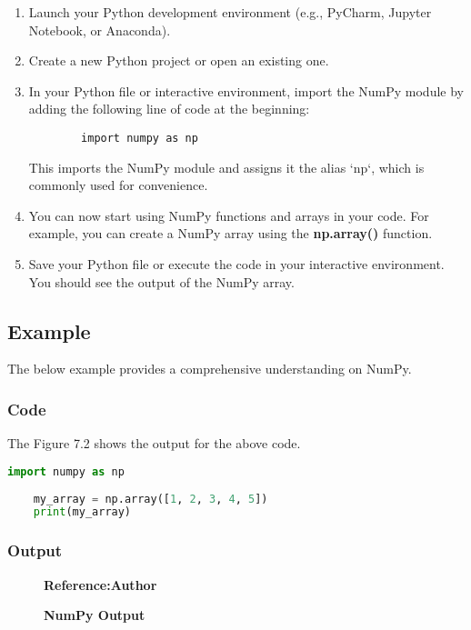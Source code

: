 \begin{enumerate}
	\item Launch your Python development environment (e.g., PyCharm, Jupyter Notebook, or Anaconda).
	\item Create a new Python project or open an existing one.
	\item In your Python file or interactive environment, import the NumPy module by adding the following line of code at the beginning:
	
	\begin{verbatim}
		import numpy as np
	\end{verbatim}
	
	This imports the NumPy module and assigns it the alias `np`, which is commonly used for convenience.
	
	\item You can now start using NumPy functions and arrays in your code. For example, you can create a NumPy array using the \textbf{np.array()}  function.
	
	\item Save your Python file or execute the code in your interactive environment. You should see the output of the NumPy array.
\end{enumerate}

\subsection{Example}

The below example provides a comprehensive understanding on NumPy.

\subsubsection{Code}

The Figure 7.2 shows the output for the above code.

\begin{lstlisting}[language=Python]
	import numpy as np
	
	my_array = np.array([1, 2, 3, 4, 5])
	print(my_array)
\end{lstlisting}

\subsubsection{Output}

	\begin{figure}
	\centering
	\caption{\textbf{NumPy Output}}
	\footnotesize \textbf{Reference:Author}
	\label{fig:NumPy Output}
    \end{figure}


